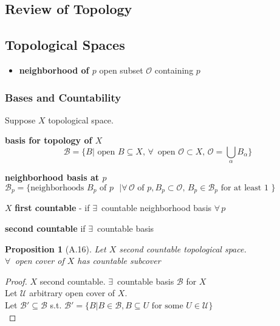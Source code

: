 \documentclass[twoside]{amsart}
\theoremstyle{plain}
\newtheorem{proposition}{Proposition}
\theoremstyle{definition}
\begin{document}
\begin{appendix}


\section{Review of Topology}

\subsection*{Topological Spaces}

\begin{itemize}
  \item \textbf{neighborhood of $p$} open subset $\mathcal{O}$ containing $p$
\end{itemize}



\subsubsection*{Bases and Countability}

Suppose $X$ topological space.

\textbf{basis for topology of $X$ } \[
\mathcal{B} = \lbrace B | \text{ open } B \subseteq X, \, \forall \,  \text{ open } \mathcal{O} \subset X, \, \mathcal{O} = \bigcup_{\alpha} B_{\alpha} \rbrace
\]

\textbf{neighborhood basis at $p$ } $\mathcal{B}_p = \lbrace \text{neighborhoods } B_p \text{ of $p$ } | \forall \, \mathcal{O} \text{ of } p,  B_p \subset \mathcal{O}, \, B_p \in \mathcal{B}_p \text{ for at least 1 } \rbrace$

$X$ \textbf{first countable }- if $\exists \, $ countable neighborhood basis $\forall \, p$

\textbf{second countable } if $\exists \, $ countable basis

\begin{proposition}[A.16]  Let $X$ second countable topological space. \\
$\forall \, $ open cover of $X$ has countable subcover
\end{proposition}

\begin{proof}
  $X$ second countable. $\exists \, $ countable basis $\mathcal{B}$ for $X$ \\
Let $\mathcal{U}$ arbitrary open cover of $X$. \\
Let $\mathcal{B}' \subseteq \mathcal{B}$ s.t. $\mathcal{B}' = \lbrace  B | B \in \mathcal{B}, B\subseteq U \text{ for some } U \in \mathcal{U} \rbrace$ \\


\end{proof}
\end{appendix}
\end{document}
